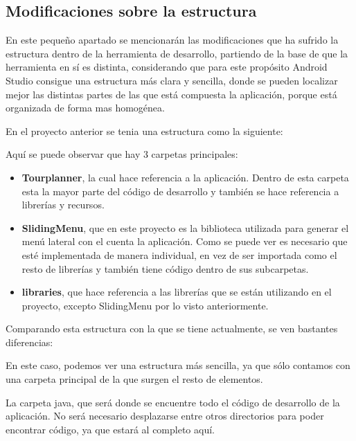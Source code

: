 \subsection{Modificaciones sobre la estructura}

En este pequeño apartado se mencionarán las modificaciones que ha sufrido la estructura dentro de la herramienta de desarrollo, partiendo de la base de que la herramienta en sí es distinta, considerando que para este propósito Android Studio consigue una estructura más clara y sencilla, donde se pueden localizar mejor las distintas partes de las que está compuesta la aplicación, porque está organizada de forma mas homogénea.

En el proyecto anterior se tenia una estructura como la siguiente:


Aquí se puede observar que hay 3 carpetas principales:

\begin{itemize}
\item \textbf{Tourplanner}, la cual hace referencia a la aplicación. Dentro de esta carpeta esta la mayor parte del código de desarrollo y también se hace referencia a librerías y recursos.
\item \textbf{SlidingMenu}, que en este proyecto es la biblioteca utilizada para generar el menú lateral con el cuenta la aplicación. Como se puede ver es necesario que esté implementada de manera individual, en vez de ser importada como el resto de librerías y también tiene código dentro de sus subcarpetas.
\item \textbf{libraries}, que hace referencia a las librerías que se están utilizando en el proyecto, excepto SlidingMenu por lo visto anteriormente.
\end{itemize}

Comparando esta estructura con la que se tiene actualmente, se ven bastantes diferencias:


En este caso, podemos ver una estructura más sencilla, ya que sólo contamos con una carpeta principal de la que surgen el resto de elementos. 

La carpeta java, que será donde se encuentre todo el código de desarrollo de la aplicación. No será necesario desplazarse entre otros directorios para poder encontrar código, ya que estará al completo aquí.

